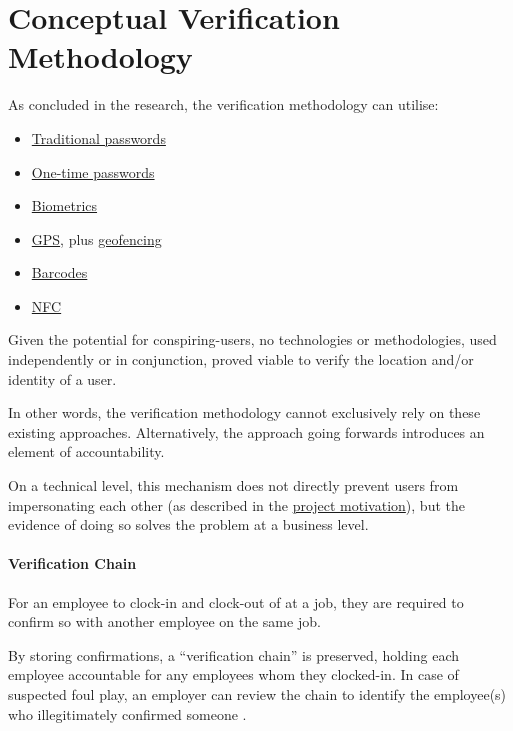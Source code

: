 \section{Conceptual Verification Methodology}
\label{s:concept}

As concluded in the research, the verification methodology
can utilise: 

\begin{itemize} 

  \item \hyperref[ss:passwords]{Traditional passwords}

  \item \hyperref[ss:otp]{One-time passwords}

  \item \hyperref[ss:biometrics]{Biometrics}

  \item \hyperref[ss:gps]{GPS}, plus
        \hyperref[ss:geofencing]{geofencing} 

  \item \hyperref[ss:barcodes]{Barcodes} 

  \item \hyperref[ss:nfc]{NFC} 

\end{itemize} 

Given the potential for \gls{conspiring-users}, no
technologies or methodologies, used independently or in
conjunction, proved viable to verify the location and/or
identity of a user.

In other words, the verification methodology cannot
exclusively rely on these existing approaches.
Alternatively, the approach going forwards introduces an
element of accountability.

On a technical level, this mechanism does not directly
prevent users from impersonating each other (as described
in the \hyperref[s:motivation]{project motivation}), but
the evidence of doing so solves the problem at a business
level.

\paragraph{Verification Chain}

For an employee to \gls{clock-in} and \gls{clock-out} of at
a job, they are required to confirm so with another
employee on the same job.

By storing confirmations, a \enquote{verification chain} is
preserved, holding each employee accountable for any
employees whom they clocked-in.
In case of suspected foul play, an employer can review the
chain to identify the employee(s) who illegitimately
confirmed someone .

